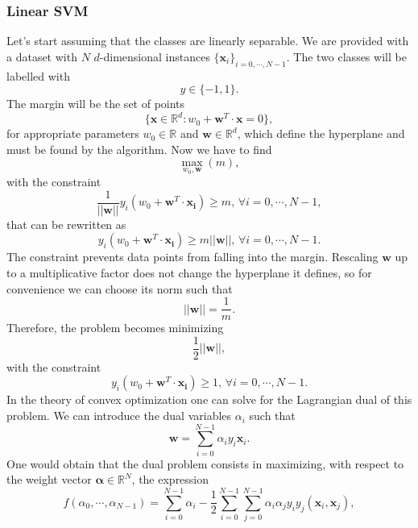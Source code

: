 \documentclass[12pt]{article}
\begin{document}
\subsubsection{Linear SVM}
Let's start assuming that the classes are linearly separable. We are provided with a dataset with $N$ $d$-dimensional instances $\{\mathbf{x}_i\}_{i=0,\cdots, N-1}$. The two classes will be labelled with $$y\in \{-1,1\}.$$ The margin will be the set of points 
\begin{equation}
    \{\mathbf{x}\in\mathbb{R}^d: w_0+\mathbf{w}^T\cdot \mathbf{x}=0\},
    \label{margin definition}
\end{equation}  
for appropriate parameters $w_0\in \mathbb{R}$ and $\mathbf{w}\in \mathbb{R}^d$, which define the hyperplane and must be found by the algorithm. Now we have to find $$\max_{w_0, \mathbf{w}}(m),$$ with the constraint 
\begin{equation}
    \frac{1}{||\mathbf{w}||}y_i(w_0+\mathbf{w}^T\cdot \mathbf{x_i})\geq m, \, \forall i=0,\cdots, N-1,
\end{equation}
that can be rewritten as 
\begin{equation}
    y_i(w_0+\mathbf{w}^T\cdot \mathbf{x_i})\geq m||\mathbf{w}||, \, \forall i=0,\cdots, N-1.
\end{equation}
The constraint prevents data points from falling into the margin. Rescaling $\mathbf{w}$ up to a multiplicative factor does not change the hyperplane it defines, so for convenience we can choose its norm such that 
\begin{equation}
    ||\mathbf{w}||=\frac{1}{m}.
\end{equation}
Therefore, the problem becomes minimizing
$$\frac{1}{2}||\mathbf{w}||, $$ with the constraint 
\begin{equation}
    y_i(w_0+\mathbf{w}^T\cdot \mathbf{x_i})\geq 1, \, \forall i=0,\cdots, N-1.
    \label{constraint hard margin}
\end{equation}
In the theory of convex optimization one can solve for the Lagrangian dual of this problem. We can introduce the dual variables $\alpha_i$ such that
\begin{equation}
    \mathbf{w}=\sum_{i=0}^{N-1}\alpha_iy_i\mathbf{x}_i.
    \label{alpha def}
\end{equation} 
One would obtain that the dual problem consists in maximizing, with respect to the weight vector $\mathbf{\alpha}\in\mathbb{R}^N$, the expression 
\begin{equation}
    f(\alpha_0,\cdots,\alpha_{N-1})=\sum_{i=0}^{N-1} \alpha_i-\frac{1}{2}\sum_{i=0}^{N-1}\sum_{j=0}^{N-1}\alpha_i\alpha_jy_iy_j(\mathbf{x}_i,\mathbf{x}_j),
    \label{dual problem SVM}
\end{equation}
\end{document}
